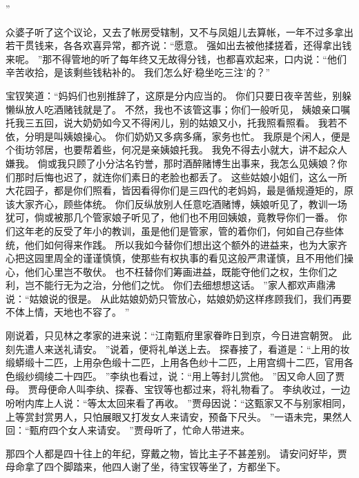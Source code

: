 ”\par
众婆子听了这个议论，又去了帐房受辖制，又不与凤姐儿去算帐，一年不过多拿出若干贯钱来，各各欢喜异常，都齐说：“愿意。
强如出去被他揉搓着，还得拿出钱来呢。
”那不得管地的听了每年终又无故得分钱，也都喜欢起来，口内说：“他们辛苦收拾，是该剩些钱粘补的。
我们怎么好‘稳坐吃三注’的？”\par
宝钗笑道：“妈妈们也别推辞了，这原是分内应当的。
你们只要日夜辛苦些，别躲懒纵放人吃酒赌钱就是了。
不然，我也不该管这事；你们一般听见，
姨娘亲口嘱托我三五回，说大奶奶如今又不得闲儿，别的姑娘又小，托我照看照看。
我若不依，分明是叫姨娘操心。
你们奶奶又多病多痛，家务也忙。
我原是个闲人，便是个街坊邻居，也要帮着些，何况是亲姨娘托我。
我免不得去小就大，讲不起众人嫌我。
倘或我只顾了小分沽名钓誉，那时酒醉赌博生出事来，我怎么见姨娘？你们那时后悔也迟了，就连你们素日的老脸也都丢了。
这些姑娘小姐们，这么一所大花园子，都是你们照看，皆因看得你们是三四代的老妈妈，最是循规遵矩的，原该大家齐心，顾些体统。
你们反纵放别人任意吃酒赌博，姨娘听见了，教训一场犹可，倘或被那几个管家娘子听见了，他们也不用回姨娘，竟教导你们一番。
你们这年老的反受了年小的教训，虽是他们是管家，管的着你们，何如自己存些体统，他们如何得来作践。
所以我如今替你们想出这个额外的进益来，也为大家齐心把这园里周全的谨谨慎慎，使那些有权执事的看见这般严肃谨慎，且不用他们操心，他们心里岂不敬伏。
也不枉替你们筹画进益，既能夺他们之权，生你们之利，岂不能行无为之治，分他们之忧。
你们去细想想这话。
”家人都欢声鼎沸说：“姑娘说的很是。
从此姑娘奶奶只管放心，姑娘奶奶这样疼顾我们，我们再要不体上情，天地也不容了。
”\par
刚说着，只见林之孝家的进来说：“江南甄府里家眷昨日到京，今日进宫朝贺。
此刻先遣人来送礼请安。
”说着，便将礼单送上去。
探春接了，看道是：“上用的妆缎蟒缎十二匹，上用杂色缎十二匹，上用各色纱十二匹，上用宫绸十二匹，官用各色缎纱绸绫二十四匹。
”李纨也看过，说：“用上等封儿赏他。
”因又命人回了贾母。
贾母便命人叫李纨、探春、宝钗等也都过来，将礼物看了。
李纨收过，一边吩咐内库上人说：“等太太回来看了再收。
”贾母因说：“这甄家又不与别家相同，上等赏封赏男人，只怕展眼又打发女人来请安，预备下尺头。
”一语未完，果然人回：“甄府四个女人来请安。
”贾母听了，忙命人带进来。
\par
那四个人都是四十往上的年纪，穿戴之物，皆比主子不甚差别。
请安问好毕，贾母命拿了四个脚踏来，他四人谢了坐，待宝钗等坐了，方都坐下。
